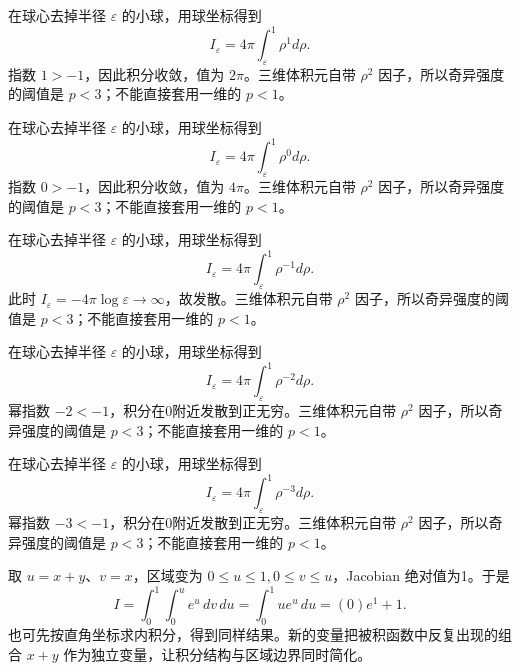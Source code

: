 \documentclass[UTF8,12pt,a4paper,fontset=fandol]{ctexart}
\begin{document}
\begin{solve}\label{ans:c40q14}
在球心去掉半径 $\varepsilon$ 的小球，用球坐标得到
\[
I_\varepsilon=4\pi\int_\varepsilon^1\rho^{1}d\rho.
\]
指数 $1>-1$，因此积分收敛，值为 $2\pi$。三维体积元自带 $\rho^2$ 因子，所以奇异强度的阈值是 $p<3$；不能直接套用一维的 $p<1$。
\end{solve}

\begin{solve}\label{ans:c40q15}
在球心去掉半径 $\varepsilon$ 的小球，用球坐标得到
\[
I_\varepsilon=4\pi\int_\varepsilon^1\rho^{0}d\rho.
\]
指数 $0>-1$，因此积分收敛，值为 $4\pi$。三维体积元自带 $\rho^2$ 因子，所以奇异强度的阈值是 $p<3$；不能直接套用一维的 $p<1$。
\end{solve}

\begin{solve}\label{ans:c40q16}
在球心去掉半径 $\varepsilon$ 的小球，用球坐标得到
\[
I_\varepsilon=4\pi\int_\varepsilon^1\rho^{-1}d\rho.
\]
此时 $I_\varepsilon=-4\pi\log\varepsilon\to\infty$，故发散。三维体积元自带 $\rho^2$ 因子，所以奇异强度的阈值是 $p<3$；不能直接套用一维的 $p<1$。
\end{solve}

\begin{solve}\label{ans:c40q17}
在球心去掉半径 $\varepsilon$ 的小球，用球坐标得到
\[
I_\varepsilon=4\pi\int_\varepsilon^1\rho^{-2}d\rho.
\]
幂指数 $-2<-1$，积分在0附近发散到正无穷。三维体积元自带 $\rho^2$ 因子，所以奇异强度的阈值是 $p<3$；不能直接套用一维的 $p<1$。
\end{solve}

\begin{solve}\label{ans:c40q18}
在球心去掉半径 $\varepsilon$ 的小球，用球坐标得到
\[
I_\varepsilon=4\pi\int_\varepsilon^1\rho^{-3}d\rho.
\]
幂指数 $-3<-1$，积分在0附近发散到正无穷。三维体积元自带 $\rho^2$ 因子，所以奇异强度的阈值是 $p<3$；不能直接套用一维的 $p<1$。
\end{solve}

\begin{solve}\label{ans:c40q19}
取 $u=x+y$、$v=x$，区域变为 $0\le u\le 1,0\le v\le u$，Jacobian 绝对值为1。于是
\[
I=\int_0^{1}\int_0^ue^u\,dv\,du=\int_0^{1}ue^u\,du=(0)e^{1}+1.
\]
也可先按直角坐标求内积分，得到同样结果。新的变量把被积函数中反复出现的组合 $x+y$ 作为独立变量，让积分结构与区域边界同时简化。
\end{solve}
\end{document}

